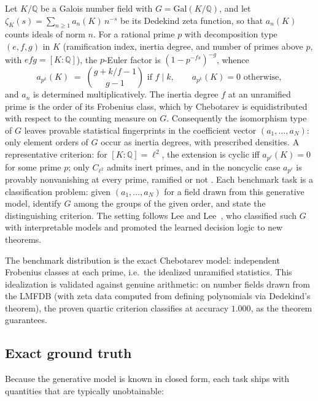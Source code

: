 \documentclass[10pt]{article}
\newcommand{\Q}{\mathbb{Q}}
\begin{document}
Let $K/\Q$ be a Galois number field with $G = \mathrm{Gal}(K/\Q)$, and
let $\zeta_K(s) = \sum_{n \ge 1} a_n(K)\, n^{-s}$ be its Dedekind zeta
function, so that $a_n(K)$ counts ideals of norm $n$. For a rational
prime $p$ with decomposition type $(e, f, g)$ in $K$ (ramification
index, inertia degree, and number of primes above $p$, with
$efg = [K{:}\Q]$), the $p$-Euler factor is $(1 - p^{-fs})^{-g}$, whence
\[
a_{p^k}(K) \;=\; \binom{g + k/f - 1}{\,g - 1\,} \text{ if } f \mid k,
\qquad a_{p^k}(K) = 0 \text{ otherwise},
\]
and $a_n$ is determined multiplicatively. The inertia degree $f$ at an
unramified prime is the order of its Frobenius class, which by
Chebotarev is equidistributed with respect to the counting measure on
$G$. Consequently the isomorphism type of $G$ leaves provable
statistical fingerprints in the coefficient vector
$(a_1, \dots, a_N)$: only element orders of $G$ occur as inertia
degrees, with prescribed densities. A representative criterion: for
$[K{:}\Q] = \ell^2$, the extension is cyclic iff $a_{p^\ell}(K) = 0$
for some prime $p$; only $C_{\ell^2}$ admits inert primes, and in the
noncyclic case $a_{p^\ell}$ is provably nonvanishing at every prime,
ramified or not \cite{LeeLee2025}. Each
benchmark task is a classification problem: given
$(a_1, \dots, a_N)$ for a field drawn from this generative model,
identify $G$ among the groups of the given order, and state the
distinguishing criterion. The setting follows Lee and
Lee~\cite{LeeLee2025}, who classified such $G$ with interpretable
models and promoted the learned decision logic to new theorems.

The benchmark distribution is the exact Chebotarev model: independent
Frobenius classes at each prime, i.e.\ the idealized unramified
statistics. This idealization is validated against genuine arithmetic:
on number fields drawn from the LMFDB (with zeta data computed from
defining polynomials via Dedekind's theorem), the proven quartic
criterion classifies at accuracy $1.000$, as the theorem guarantees.

\subsection*{Exact ground truth}

Because the generative model is known in closed form, each task ships
with quantities that are typically unobtainable:
\end{document}
